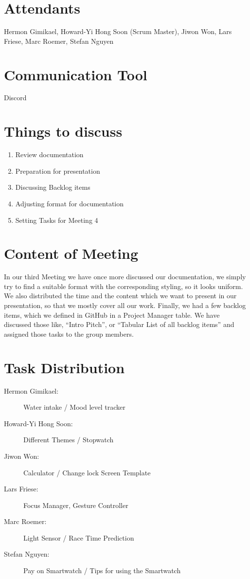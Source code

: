 \documentclass{article}
\begin{document}
\section*{Attendants}
Hermon Gimikael, Howard-Yi Hong Soon (Scrum Master), Jiwon Won, Lars Friese, Marc Roemer, Stefan Nguyen

\section*{Communication Tool}
Discord

\section*{Things to discuss}
\begin{enumerate}
    \item Review documentation
    \item Preparation for presentation
    \item Discussing Backlog items
    \item Adjusting format for documentation
    \item Setting Tasks for Meeting 4
\end{enumerate}

\section*{Content of Meeting}
In our third Meeting we have once more discussed our documentation, we simply try to find a suitable format with the corresponding styling, so it looks uniform. We also distributed the time and the content which we want to present in our presentation, so that we mostly cover all our work. Finally, we had a few backlog items, which we defined in GitHub in a Project Manager table. We have discussed those like, “Intro Pitch”, or “Tabular List of all backlog items” and assigned those tasks to the group members. 

\section*{Task Distribution}
\begin{description}
    \item[Hermon Gimikael:] Water intake / Mood level tracker 
    \item[Howard-Yi Hong Soon:] Different Themes / Stopwatch
    \item[Jiwon Won:] Calculator / Change lock Screen Template
    \item[Lars Friese:] Focus Manager, Gesture Controller
    \item[Marc Roemer:] Light Sensor / Race Time Prediction 
    \item[Stefan Nguyen:] Pay on Smartwatch / Tips for using the Smartwatch
\end{description}
\end{document}
